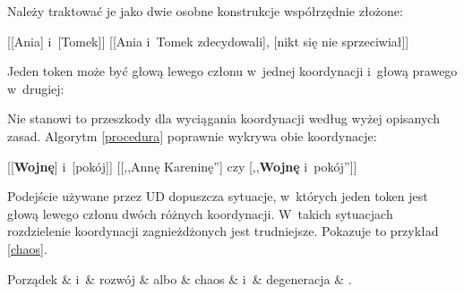 Należy traktować je jako dwie osobne konstrukcje współrzędnie złożone:

\begin{exe}
\ex \label{zagnieżdżona-1}
{[[Ania] i~[Tomek]]}
\ex \label{zagnieżdżona-2}
{[[Ania i~Tomek zdecydowali], [nikt się nie sprzeciwiał]]}
\end{exe}

Jeden token może być głową lewego członu w~jednej koordynacji i~głową prawego w~drugiej:

\begin{exe}
\ex \label{wojna+pokój}
\end{exe}

Nie stanowi to przeszkody dla wyciągania koordynacji według wyżej opisanych zasad. Algorytm \eqref{procedura} poprawnie wykrywa obie koordynacje:

\begin{exe}
\ex \label{wojna+pokój-1} 
{[[\textbf{Wojnę}] i~[pokój]]}
\ex \label{wojna+pokój-2} 
{[[,,Annę Kareninę''] czy [,,\textbf{Wojnę} i~pokój'']]}
\end{exe}

Podejście używane przez UD dopuszcza sytuacje, w~których jeden token jest głową lewego członu dwóch różnych koordynacji. W~takich sytuacjach rozdzielenie koordynacji zagnieżdżonych jest trudniejsze. Pokazuje to przykład \eqref{chaos}.

\begin{exe}
\ex \label{chaos}
\begin{dependency}[baseline=-\the\dimexpr\fontdimen22\textfont2\relax]
\begin{deptext}[column sep=1em]
Porządek \& i~\& rozwój \& albo \& chaos \& i~\& degeneracja \& .  \\ 
\end{deptext}
\end{dependency}
\end{exe}

